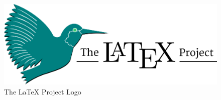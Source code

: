 \begin{figure}[H]
	\centering
	\includegraphics[width=\textwidth]{exercises/graphics/latex-logo.png}
	\caption{The \LaTeX{} Project Logo}
\end{figure}
